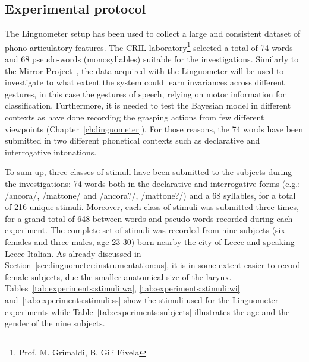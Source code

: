 \subsection{Experimental protocol}
\label{sec:experiments:protocol}
The Linguometer setup has been used to collect a large and consistent dataset
of phono-articulatory features.
The CRIL laboratory\footnote{Prof. M. Grimaldi, B. Gili Fivela} selected a
total of 74 words and 68 pseudo-words (monosyllables) suitable for the 
investigations.
Similarly to the Mirror Project~\citep{metta.etal:2006}, the data acquired
with the Linguometer will be
used to investigate to what extent the system could learn invariances across 
different gestures, in this case the gestures of speech, relying on motor 
information for classification.
Furthermore, it is needed to test the Bayesian model in different contexts as 
\citet{metta.etal:2006} have done recording the grasping actions from few
different viewpoints (Chapter~\ref{ch:linguometer}).
For those reasons, the 74 words have been submitted in two different
phonetical contexts such as declarative and interrogative intonations.



To sum up, three classes of stimuli have been submitted to the subjects 
during the investigations: 74 words both in the declarative and interrogative 
forms (e.g.: /ancora/, /mattone/ and /ancora?/, /mattone?/) and a 68 syllables, 
for a total of 216 unique stimuli.
Moreover, each class of stimuli was submitted three times, for a grand total 
of 648 between words and pseudo-words recorded during each experiment.
The complete set of stimuli was recorded from nine subjects (six females and
three males, age 23-30) born nearby the city of Lecce and speaking Lecce
Italian.
As already discussed in Section~\ref{sec:linguometer:instrumentation:us}, it is in
some extent easier to record female subjects, due the smaller anatomical size of
the larynx.
Tables~\ref{tab:experiments:stimuli:wa}, \ref{tab:experiments:stimuli:wi} 
and~\ref{tab:experiments:stimuli:ss} show the stimuli used for the
Linguometer experiments while Table~\ref{tab:experiments:subjects} illustrates 
the age and the gender of the nine subjects.


